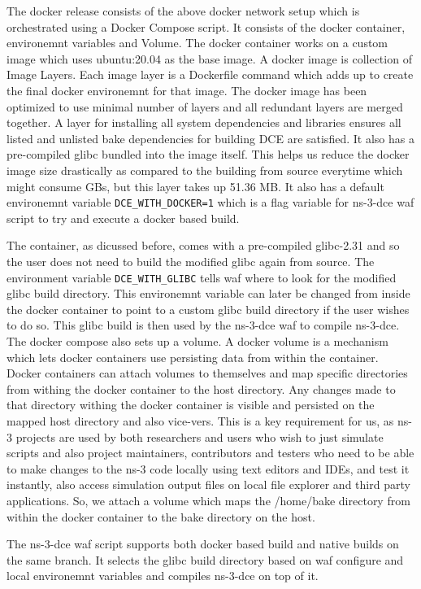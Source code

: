 \documentclass{sig-alternate}
\begin{document}
The docker release consists of the above docker network setup which is orchestrated using a Docker Compose script. 
It consists of the docker container, environemnt variables and Volume. The docker 
container works on a custom image which uses ubuntu:20.04 as the base image. A docker image is collection of Image Layers. Each image layer is a 
Dockerfile command which adds up to create the final docker environemnt for that image. The docker image has been optimized to use minimal number of layers and 
all redundant layers are merged together. A layer for installing all system dependencies and libraries ensures all listed and unlisted bake 
dependencies for building DCE are satisfied. It also has a pre-compiled glibc bundled into the image itself. This helps us reduce the docker 
image size drastically as compared to the building from source everytime which might consume GBs, but this layer takes up 51.36 MB.
It also has a default environemnt variable 
\texttt{DCE\_WITH\_DOCKER=1} which is a flag variable for ns-3-dce waf script to try and execute a docker based build.

The container, as dicussed before, comes with a pre-compiled glibc-2.31 and so the user does not need to build the modified glibc again from source.
The environment variable \texttt{DCE\_WITH\_GLIBC} tells waf where to look for the modified glibc build directory. This environemnt variable can 
later be changed from inside the docker container to point to a custom glibc build directory if the user wishes to do so. This glibc build is then 
used by the ns-3-dce waf to compile ns-3-dce. The docker compose also sets up a volume. A docker volume is a mechanism which lets docker containers 
use persisting data from within the container. Docker containers can attach volumes to themselves
and map specific directories from withing the docker container to the host directory. Any changes made to that directory withing the  docker container
is visible and persisted on the mapped host directory and also vice-vers. This is a key requirement for us, as ns-3 projects are used by both 
researchers and users who wish to just simulate scripts and also project maintainers, contributors and testers who need to be able to make changes 
to the ns-3 code locally using text editors and IDEs, and test it instantly, also access simulation output files on local file explorer and 
third party applications. So, we attach a volume which maps the /home/bake directory from within the docker container to the bake directory on 
the host.

The ns-3-dce waf script supports both docker based build and native builds on the same branch. It selects the glibc 
build directory based on waf configure and local environemnt variables and compiles ns-3-dce on top of it.
\end{document}
